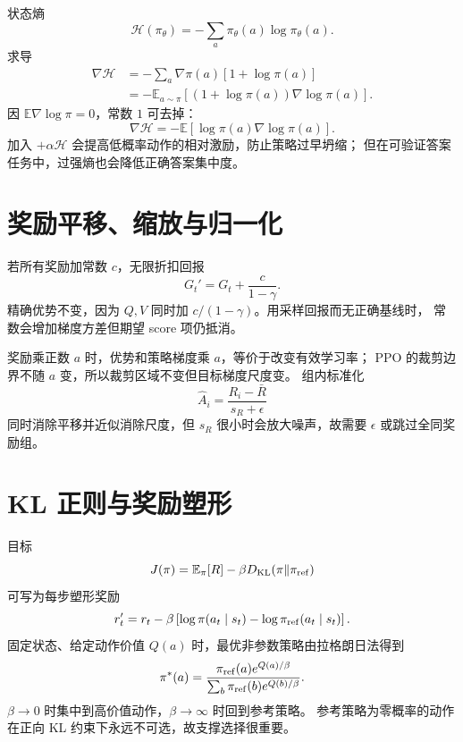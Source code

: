 \documentclass[11pt]{article}
\numberwithin{equation}{section}
\newcommand{\E}{\mathbb{E}}
\newcommand{\1}{\mathbf{1}}
\begin{document}
状态熵
\begin{equation}
 \mathcal H(\pi_\theta)=-\sum_a\pi_\theta(a)\log\pi_\theta(a).
\end{equation}
求导
\begin{align}
 \nabla\mathcal H
 &=-\sum_a\nabla\pi(a)[1+\log\pi(a)]\\
 &=-\E_{a\sim\pi}
 [(1+\log\pi(a))\nabla\log\pi(a)].
\end{align}
因 $\E\nabla\log\pi=0$，常数 $1$ 可去掉：
\begin{equation}
 \nabla\mathcal H
 =-\E[\log\pi(a)\nabla\log\pi(a)].
\end{equation}
加入 $+\alpha\mathcal H$ 会提高低概率动作的相对激励，防止策略过早坍缩；
但在可验证答案任务中，过强熵也会降低正确答案集中度。

\section{奖励平移、缩放与归一化}

若所有奖励加常数 $c$，无限折扣回报
\begin{equation}
 G_t'=G_t+\frac{c}{1-\gamma}.
\end{equation}
精确优势不变，因为 $Q,V$ 同时加 $c/(1-\gamma)$。用采样回报而无正确基线时，
常数会增加梯度方差但期望 score 项仍抵消。

奖励乘正数 $a$ 时，优势和策略梯度乘 $a$，等价于改变有效学习率；
PPO 的裁剪边界不随 $a$ 变，所以裁剪区域不变但目标梯度尺度变。
组内标准化
\begin{equation}
 \widehat A_i=\frac{R_i-\bar R}{s_R+\epsilon}
\end{equation}
同时消除平移并近似消除尺度，但 $s_R$ 很小时会放大噪声，故需要 $\epsilon$ 或跳过全同奖励组。

\section{KL 正则与奖励塑形}

目标
\begin{equation}
 J(\pi)=\E_\pi[R]-\beta D_{\rm KL}(\pi\|\pi_{\rm ref})
\end{equation}
可写为每步塑形奖励
\begin{equation}
 r_t'=r_t-\beta
 \left[\log\pi(a_t\mid s_t)-\log\pi_{\rm ref}(a_t\mid s_t)\right].
\end{equation}
固定状态、给定动作价值 $Q(a)$ 时，最优非参数策略由拉格朗日法得到
\begin{equation}
 \pi^*(a)=\frac{\pi_{\rm ref}(a)e^{Q(a)/\beta}}
 {\sum_b\pi_{\rm ref}(b)e^{Q(b)/\beta}}.
\end{equation}
$\beta\to0$ 时集中到高价值动作，$\beta\to\infty$ 时回到参考策略。
参考策略为零概率的动作在正向 KL 约束下永远不可选，故支撑选择很重要。
\end{document}
